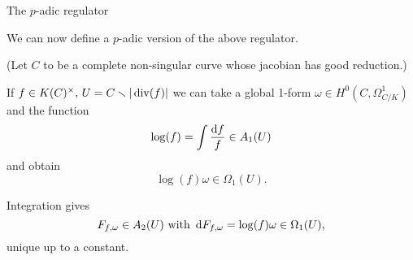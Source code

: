 \begin{frame}{The \(p\)-adic regulator}

We can now define a \(p\)-adic version of the above regulator.%
\pause

(Let \(C\) to be a complete non-singular curve whose jacobian has good reduction.)

If \(
f \in K(C)^\times,\,U = C \smallsetminus |\operatorname{div} (f)|
\) we can take a global 1-form \(\omega \in H^0(C, \Omega_{C/K}^1)\) and the function%
\begin{equation*}
\log(f)  = \int \frac{\mathop{}\!\mathrm{d} f}f\in A_1(U)
\end{equation*}
and obtain
\begin{equation*}
\log(f) \omega \in \Omega_1(U)\text{.}
\end{equation*}

Integration gives%
\begin{equation*}
F_{f,\omega} \in A_2(U) \text{ with } \mathop{}\!\mathrm{d} F_{f,\omega} = \log(f) \omega \in \Omega_1(U)\text{,}
\end{equation*}
unique up to a constant.%
\end{frame}

